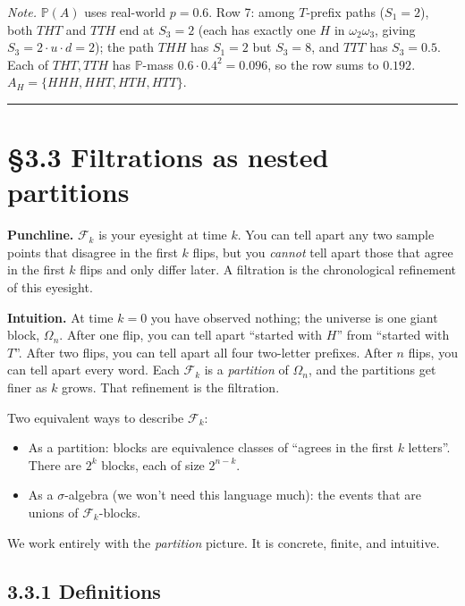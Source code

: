 \documentclass[
  10pt,
  twoside]{book}
\providecommand{\tightlist}{%
  \setlength{\itemsep}{0pt}\setlength{\parskip}{0pt}}
\begin{document}
\emph{Note.} \(\mathbb P(A)\) uses real-world \(p=0.6\). Row 7: among
\(T\)-prefix paths (\(S_1=2\)), both \(THT\) and \(TTH\) end at
\(S_3=2\) (each has exactly one \(H\) in \(\omega_2\omega_3\), giving
\(S_3 = 2 \cdot u \cdot d = 2\)); the path \(THH\) has \(S_1=2\) but
\(S_3=8\), and \(TTT\) has \(S_3=0.5\). Each of \(THT, TTH\) has
\(\mathbb P\)-mass \(0.6 \cdot 0.4^2 = 0.096\), so the row sums to
\(0.192\). \(A_H = \{HHH, HHT, HTH, HTT\}\).

\begin{center}\rule{0.5\linewidth}{0.5pt}\end{center}

\section{§3.3 Filtrations as nested
partitions}\label{filtrations-as-nested-partitions}

\textbf{Punchline.} \(\mathcal F_k\) is your eyesight at time \(k\). You
can tell apart any two sample points that disagree in the first \(k\)
flips, but you \emph{cannot} tell apart those that agree in the first
\(k\) flips and only differ later. A filtration is the chronological
refinement of this eyesight.

\textbf{Intuition.} At time \(k=0\) you have observed nothing; the
universe is one giant block, \(\Omega_n\). After one flip, you can tell
apart ``started with \(H\)'' from ``started with \(T\)''. After two
flips, you can tell apart all four two-letter prefixes. After \(n\)
flips, you can tell apart every word. Each \(\mathcal F_k\) is a
\emph{partition} of \(\Omega_n\), and the partitions get finer as \(k\)
grows. That refinement is the filtration.

Two equivalent ways to describe \(\mathcal F_k\):

\begin{itemize}
\tightlist
\item
  As a partition: blocks are equivalence classes of ``agrees in the
  first \(k\) letters''. There are \(2^k\) blocks, each of size
  \(2^{n-k}\).
\item
  As a \(\sigma\)-algebra (we won't need this language much): the events
  that are unions of \(\mathcal F_k\)-blocks.
\end{itemize}

We work entirely with the \emph{partition} picture. It is concrete,
finite, and intuitive.

\subsection{3.3.1 Definitions}\label{definitions-8}
\end{document}

